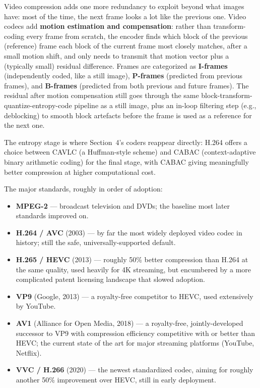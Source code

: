 \documentclass[11pt]{article}
\begin{document}
Video compression adds one more redundancy to exploit beyond what images have: most of the time, the next frame looks a lot like the previous one. Video codecs add \textbf{motion estimation and compensation}: rather than transform-coding every frame from scratch, the encoder finds which block of the previous (reference) frame each block of the current frame most closely matches, after a small motion shift, and only needs to transmit that motion vector plus a (typically small) residual difference. Frames are categorized as \textbf{I-frames} (independently coded, like a still image), \textbf{P-frames} (predicted from previous frames), and \textbf{B-frames} (predicted from both previous and future frames). The residual after motion compensation still goes through the same block-transform-quantize-entropy-code pipeline as a still image, plus an in-loop filtering step (e.g., deblocking) to smooth block artefacts before the frame is used as a reference for the next one.

The entropy stage is where Section~4's coders reappear directly: H.264 offers a choice between CAVLC (a Huffman-style scheme) and CABAC (context-adaptive binary arithmetic coding) for the final stage, with CABAC giving meaningfully better compression at higher computational cost.

The major standards, roughly in order of adoption:
\begin{itemize}[leftmargin=1.4em]
  \item \textbf{MPEG-2} — broadcast television and DVDs; the baseline most later standards improved on.
  \item \textbf{H.264 / AVC} (2003) — by far the most widely deployed video codec in history; still the safe, universally-supported default.
  \item \textbf{H.265 / HEVC} (2013) — roughly 50\% better compression than H.264 at the same quality, used heavily for 4K streaming, but encumbered by a more complicated patent licensing landscape that slowed adoption.
  \item \textbf{VP9} (Google, 2013) — a royalty-free competitor to HEVC, used extensively by YouTube.
  \item \textbf{AV1} (Alliance for Open Media, 2018) — a royalty-free, jointly-developed successor to VP9 with compression efficiency competitive with or better than HEVC; the current state of the art for major streaming platforms (YouTube, Netflix).
  \item \textbf{VVC / H.266} (2020) — the newest standardized codec, aiming for roughly another 50\% improvement over HEVC, still in early deployment.
\end{itemize}
\end{document}

